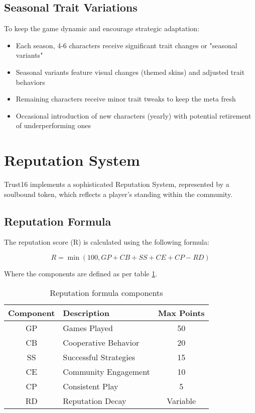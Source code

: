 \documentclass[table, twocolumn]{article}
\begin{document}
\subsection{Seasonal Trait Variations}
To keep the game dynamic and encourage strategic adaptation:
\begin{itemize}
    \item Each season, 4-6 characters receive significant trait changes or "seasonal variants"
    \item Seasonal variants feature visual changes (themed skins) and adjusted trait behaviors
    \item Remaining characters receive minor trait tweaks to keep the meta fresh
    \item Occasional introduction of new characters (yearly) with potential retirement of underperforming ones
\end{itemize}

\section{Reputation System}

Trust16 implements a sophisticated Reputation System, represented by a soulbound token,
which reflects a player's standing within the community.

\subsection{Reputation Formula}
The reputation score (R) is calculated using the following formula:

\begin{equation}
R = \min(100, GP + CB + SS + CE + CP - RD)
\end{equation}

Where the components are defined as per table \ref{tab:reputation-components}.

\begin{table}[!htb]
  \centering
  \begin{tabular}{|c|p{5cm}|c|}
    \hline \rowcolor{gray!20}
    Component & Description                    & Max Points \\ \hline
    GP        & Games Played                   & 50         \\ \hline
    CB        & Cooperative Behavior           & 20         \\ \hline
    SS        & Successful Strategies          & 15         \\ \hline
    CE        & Community Engagement           & 10         \\ \hline
    CP        & Consistent Play                & 5          \\ \hline
    RD        & Reputation Decay               & Variable   \\ \hline
  \end{tabular}
  \caption{Reputation formula components}
  \label{tab:reputation-components}
\end{table}
\end{document}
